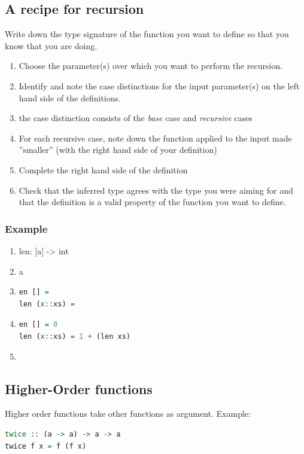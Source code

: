 \subsection{A recipe for recursion}

Write down the type signature of the function you want to define so that you know that you are doing.
\begin{enumerate}
\item Choose the parameter(s) over which you want to perform the recursion.
\item Identify and note the case distinctions for the input parameter(s) on the left hand side of the definitions.
\item the case distinction consists of the \emph{base} case and \emph{recursive} cases
\item For each recursive case, note down the function applied to the input made ''smaller'' (with the right hand side of your definition)
\item Complete the right hand side of the definition
\item Check that the inferred type agrees with the type you were aiming for and that the definition is a valid property of the function you want to define.
\end{enumerate}

\subsubsection{Example}
\begin{enumerate}
\item len: [a] -> int
\item a
\item \begin{lstlisting}[language=haskell]
en [] = 
len (x::xs) = 
\end{lstlisting}
\item \begin{lstlisting}[language=haskell]
en [] = 0
len (x::xs) = 1 + (len xs)
\end{lstlisting}
\item %
\end{enumerate}

\subsection{Higher-Order functions}
Higher order functions take other functions as argument. Example:
\begin{lstlisting}[language=haskell]
twice :: (a -> a) -> a -> a
twice f x = f (f x)
\end{lstlisting}

